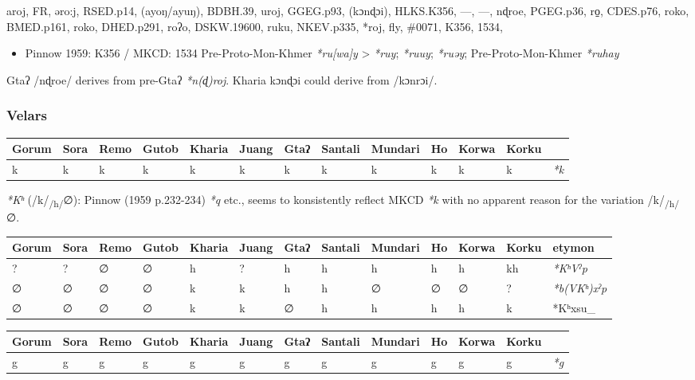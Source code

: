 \documentclass[a4paper,]{article}
\providecommand{\tightlist}{%
  \setlength{\itemsep}{0pt}\setlength{\parskip}{0pt}}
\begin{document}
aroj, FR, əro:j, RSED.p14, (ayoŋ/ayuŋ), BDBH.39, uroj, GGEG.p93,
(kɔnɖɔi), HLKS.K356, ---, ---, nɖroe, PGEG.p36, ro̠, CDES.p76, roko,
BMED.p161, roko, DHED.p291, roʔo, DSKW.19600, ruku, NKEV.p335, *roj,
fly, \#0071, K356, 1534,

\begin{itemize}
\tightlist
\item
  Pinnow 1959: K356 / MKCD: 1534 Pre-Proto-Mon-Khmer \emph{*ru{[}wa{]}y}
  \textgreater{} \emph{*ruy}; \emph{*ruuy}; \emph{*ruəy};
  Pre-Proto-Mon-Khmer \emph{*ruhay}
\end{itemize}

Gtaʔ /nɖroe/ derives from pre-Gtaʔ \emph{*n(ɖ)roj}. Kharia kɔnɖɔi could
derive from /kɔnrɔi/.

\subsubsection{Velars}\label{velars}

\begin{longtable}[]{@{}lllllllllllll@{}}
\toprule
Gorum & Sora & Remo & Gutob & Kharia & Juang & Gtaʔ & Santali & Mundari
& Ho & Korwa & Korku &\tabularnewline
\midrule
\endhead
k & k & k & k & k & k & k & k & k & k & k & k & \emph{*k}\tabularnewline
\bottomrule
\end{longtable}

\emph{*Kʰ} (/k/\textsubscript{/h/}∅): Pinnow (1959 p.232-234) \emph{*q}
etc., seems to konsistently reflect MKCD \emph{*k} with no apparent
reason for the variation /k/\textsubscript{/h/}∅.

\begin{longtable}[]{@{}lllllllllllll@{}}
\toprule
Gorum & Sora & Remo & Gutob & Kharia & Juang & Gtaʔ & Santali & Mundari
& Ho & Korwa & Korku & etymon\tabularnewline
\midrule
\endhead
? & ? & ∅ & ∅ & h & ? & h & h & h & h & h & kh &
\emph{*KʰVˀp}\tabularnewline
∅ & ∅ & ∅ & ∅ & k & k & h & h & ∅ & ∅ & ∅ & ? &
\emph{*b(VKʰ)xˀp}\tabularnewline
∅ & ∅ & ∅ & ∅ & k & k & ∅ & h & h & h & h & k & *Kʰxsu\_\tabularnewline
\bottomrule
\end{longtable}

\begin{longtable}[]{@{}lllllllllllll@{}}
\toprule
Gorum & Sora & Remo & Gutob & Kharia & Juang & Gtaʔ & Santali & Mundari
& Ho & Korwa & Korku &\tabularnewline
\midrule
\endhead
g & g & g & g & g & g & g & g & g & g & g & g & \emph{*g}\tabularnewline
\bottomrule
\end{longtable}
\end{document}
